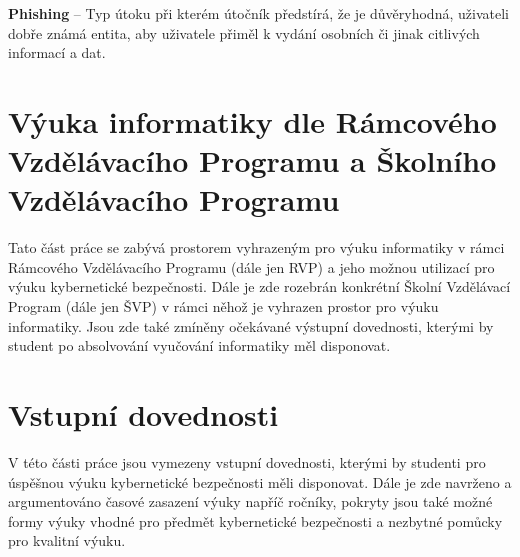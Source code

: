 \documentclass[a4paper, 12pt]{article}
\begin{document}
\textbf{Phishing} -- Typ útoku při kterém útočník předstírá, že je důvěryhodná, uživateli dobře známá entita, aby uživatele přiměl k vydání osobních či jinak citlivých informací a dat.


\newpage
\section{Výuka informatiky dle Rámcového Vzdělávacího Programu a Školního Vzdělávacího Programu}
Tato část práce se zabývá prostorem vyhrazeným pro výuku informatiky v rámci Rámcového Vzdělávacího Programu (dále jen RVP) a jeho možnou utilizací pro výuku kybernetické bezpečnosti. Dále je zde rozebrán konkrétní Školní Vzdělávací Program (dále jen ŠVP) v rámci něhož je vyhrazen prostor pro výuku informatiky. Jsou zde také zmíněny očekávané výstupní dovednosti, kterými by student po absolvování vyučování informatiky měl disponovat.

\newpage
\section{Vstupní dovednosti}
V této části práce jsou vymezeny vstupní dovednosti, kterými by studenti pro úspěšnou výuku kybernetické bezpečnosti měli disponovat. Dále je zde navrženo a argumentováno časové zasazení výuky napříč ročníky, pokryty jsou také možné formy výuky vhodné pro předmět kybernetické bezpečnosti a nezbytné pomůcky pro kvalitní výuku.
\end{document}
